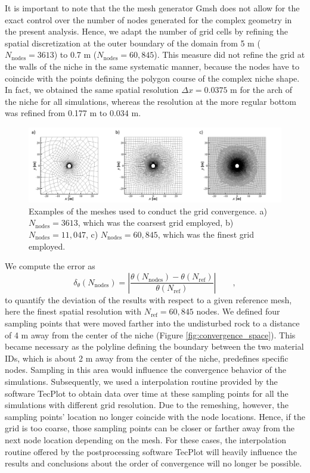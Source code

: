 It is important to note that the the mesh generator Gmsh \cite{geuzaine2009} does not allow for the exact control over the number of nodes generated for the complex geometry in the present analysis. Hence, we adapt the number of grid cells by refining the spatial discretization at the outer boundary of the domain from 5 m ($N_\text{nodes} = 3613$) to 0.7 m ($N_\text{nodes} = 60,845$). This measure did not refine the grid at the walls of the niche in the same systematic manner, because the nodes have to coincide with the points defining the polygon course of the complex niche shape. In fact, we obtained the same spatial resolution $\Delta x = 0.0375$ m for the arch of the niche for all simulations, whereas the resolution at the more regular bottom was refined from 0.177 m to 0.034 m. 

\begin{figure}[t]
\includegraphics[width=\textwidth, trim=0.4cm  0.0cm 0 0.3cm, clip]{./figures/MEX10_meshes.png}
\caption{Examples of the meshes used to conduct the grid convergence. a) $N_\text{nodes}=3613$, which was the coarsest grid employed, b) $N_\text{nodes}=11,047$, c) $N_\text{nodes}=60,845$, which was the finest grid employed.}
\label{fig:meshes}
\end{figure}

We compute the error as 
%
\begin{equation}
\delta_\theta(N_\text{nodes}) = \left \lvert \frac{\theta(N_\text{nodes}) - \theta(N_\text{ref}) }{\theta(N_\text{ref})} \right \rvert \qquad ,
\end{equation}
%
to quantify the deviation of the results with respect to a given reference mesh, here the finest spatial resolution with $N_\text{ref}=60,845$ nodes. We defined four sampling points that were moved farther into the undisturbed rock to a distance of 4 m away from the center of the niche (Figure \ref{fig:convergence_space}). This became necessary as the polyline defining the boundary between the two material IDs, which is about 2 m away from the center of the niche, predefines specific nodes. Sampling in this area would influence the convergence behavior of the simulations. Subsequently, we used a interpolation routine provided by the software TecPlot \cite{tecplot2019} to obtain data over time at these sampling points for all the simulations with different grid resolution. Due to the remeshing, however, the sampling points' location no longer coincide with the node locations. Hence, if the grid is too coarse, those sampling points can be closer or farther away from the next node location depending on the mesh. For these cases, the interpolation routine offered by the postprocessing software TecPlot will heavily influence the results and conclusions about the order of convergence will no longer be possible.


